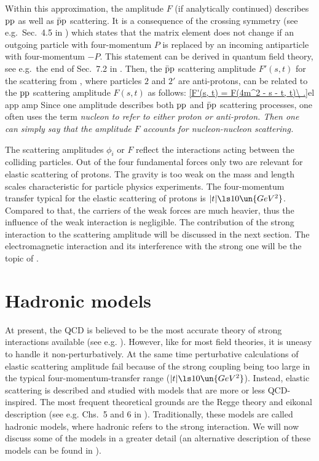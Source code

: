 Within this approximation, the amplitude $F$ (if analytically continued) describes $\rm pp$ as well as $\rm \bar pp$ scattering. It is a consequence of the crossing symmetry (see e.g.~Sec.~4.5 in ) which states that the matrix element does not change if an outgoing particle with four-momentum $P$ is replaced by an incoming antiparticle with four-momentum $-P$. This statement can be derived in quantum field theory, see e.g.~the end of Sec.~7.2 in . Then, the $\rm \bar pp$ scattering amplitude $F'(s, t)$ for the scattering from , where particles $2$ and $2'$ are anti-protons, can be related to the $\rm pp$ scattering amplitude $F(s, t)$ as follows:
\eqref{F'(s, t) = F(4m^2 - s - t, t)\ .}{el app amp}
Since one amplitude describes both $\rm pp$ and $\rm\bar pp$ scattering processes, one often uses the term \em{nucleon} to refer to either proton or anti-proton. Then one can simply say that the amplitude $F$ accounts for nucleon-nucleon scattering.

The scattering amplitudes $\phi_i$ or $F$ reflect the interactions acting between the colliding particles. Out of the four fundamental forces only two are relevant for elastic scattering of protons. The gravity is too weak on the mass and length scales characteristic for particle physics experiments. The four-momentum transfer typical for the elastic scattering of protons is $|t| \ls 10\un{GeV^2}$. Compared to that, the carriers of the weak forces are much heavier, thus the influence of the weak interaction is negligible. The contribution of the strong interaction to the scattering amplitude will be discussed in the next section. The electromagnetic interaction and its interference with the strong one will be the topic of .

\section[el models]{Hadronic models}

At present, the QCD is believed to be the most accurate theory of strong interactions available (see e.g. ). However, like for most field theories, it is uneasy to handle it non-perturbatively. At the same time perturbative calculations of elastic scattering amplitude fail because of the strong coupling being too large in the typical four-momentum-transfer range ($|t| \ls 10\un{GeV^2}$). Instead, elastic scattering is described and studied with models that are more or less QCD-inspired. The most frequent theoretical grounds are the Regge theory and eikonal description (see e.g. Chs.~5 and 6 in ). Traditionally, these models are called hadronic models, where hadronic refers to the strong interaction. We will now discuss some of the models in a greater detail (an alternative description of these models can be found in ).

